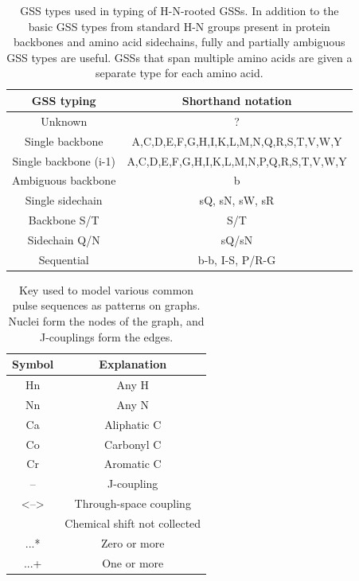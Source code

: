 \begin{table}[h]
    \begin{tabular}{ | c | c | }
    \hline
      GSS typing            &   Shorthand notation    \\ \hline
      \hline
      Unknown               &   ?                     \\ \hline
      Single backbone       &   A,C,D,E,F,G,H,I,K,L,M,N,Q,R,S,T,V,W,Y   \\ \hline
      Single backbone (i-1) &   A,C,D,E,F,G,H,I,K,L,M,N,P,Q,R,S,T,V,W,Y   \\ \hline
      Ambiguous backbone    &   b                     \\ \hline
      Single sidechain      &   sQ, sN, sW, sR        \\ \hline
      Backbone S/T          &   S/T                   \\ \hline
      Sidechain Q/N         &   sQ/sN                 \\ \hline
      Sequential            &   b-b, I-S, P/R-G       \\ \hline
    \end{tabular}
    \caption[GSS types used in typing of H-N-rooted GSSs.]
            {GSS types used in typing of H-N-rooted GSSs.  In addition to the
             basic GSS types from standard H-N groups present in protein
             backbones and amino acid sidechains,
             fully and partially ambiguous GSS types are useful.  GSSs that
             span multiple amino acids are given a separate type for each
             amino acid.}
    \label{hn_gss_types}
\end{table}

\begin{table}
    \begin{tabular}{ | c | c | }
      \hline
      Symbol    &  Explanation              \\  \hline
      \hline
      Hn        &  Any H                    \\  \hline
      Nn        &  Any N                    \\  \hline
      Ca        &  Aliphatic C              \\  \hline
      Co        &  Carbonyl C               \\  \hline
      Cr        &  Aromatic C               \\  \hline
      --        &  J-coupling               \\  \hline
      <-->      &  Through-space coupling   \\  \hline
      [...]     &  Chemical shift not collected  \\  \hline
      ...*      &  Zero or more             \\  \hline
      ...+      &  One or more              \\  \hline
    \end{tabular}
    \caption[Key used to model various common pulse sequences as patterns on graphs.]
            {Key used to model various common pulse sequences as patterns
             on graphs.  Nuclei form the nodes of the graph, and J-couplings
             form the edges.}
    \label{pulse_sequence_key}
\end{table}

